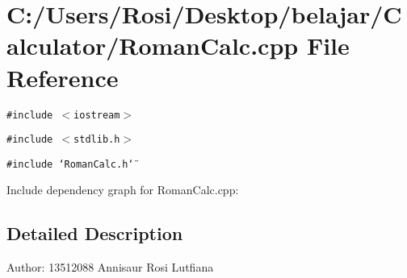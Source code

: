 \section{C:/Users/Rosi/Desktop/belajar/Calculator/Roman\-Calc.cpp File Reference}
\label{_roman_calc_8cpp}
{\tt \#include $<$iostream$>$}\par
{\tt \#include $<$stdlib.h$>$}\par
{\tt \#include \char`\"{}Roman\-Calc.h\char`\"{}}\par


Include dependency graph for Roman\-Calc.cpp:

\subsection{Detailed Description}
\begin{Desc}
\item[Author:]13512088 Annisaur Rosi Lutfiana \end{Desc}
